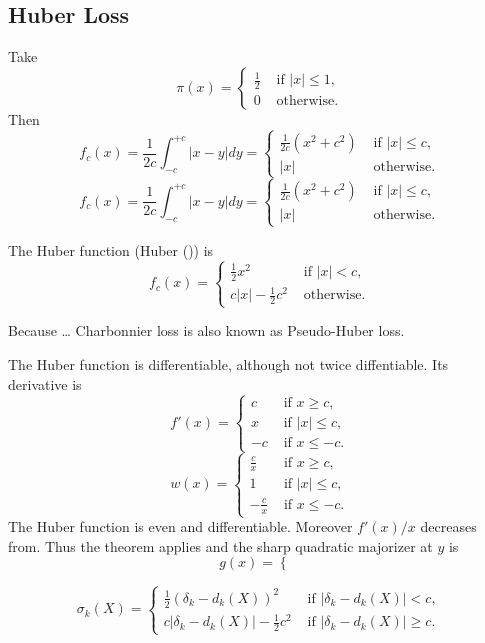 \documentclass[
  12pt,
  letterpaper,
  DIV=11,
  numbers=noendperiod]{scrartcl}
\begin{document}
\subsection{Huber Loss}\label{huber-loss}

Take \[
\pi(x)=\begin{cases}\frac12 &\text{ if }|x|\leq 1,\\0&\text{ otherwise.}\end{cases}
\] Then \[
f_c(x)=\frac{1}{2c}\int_{-c}^{+c}|x-y|dy=\begin{cases}
\frac{1}{2c}(x^2+c^2)&\text{ if }|x|\leq c,\\
|x|&\text{ otherwise}.
\end{cases}
\] \[
f_c(x)=\frac{1}{2c}\int_{-c}^{+c}|x-y|dy=\begin{cases}
\frac{1}{2c}(x^2+c^2)&\text{ if }|x|\leq c,\\
|x|&\text{ otherwise}.
\end{cases}
\]

The Huber function (Huber ()) is \[
f_c(x)=\begin{cases}
\frac12x^2&\text{ if }|x|<c,\\
c|x|-\frac12 c^2&\text{ otherwise}.
\end{cases}
\]

Because \ldots{} Charbonnier loss is also known as Pseudo-Huber loss.

The Huber function is differentiable, although not twice diffentiable.
Its derivative is \[
f'(x)=\begin{cases}
c&\text{ if }x\geq c,\\
x&\text{ if }|x|\leq c,\\
-c&\text{ if }x\leq -c.
\end{cases}
\] \[
w(x)=
\begin{cases}
\frac{c}{x}&\text{ if }x\geq c,\\
1&\text{ if }|x|\leq c,\\
-\frac{c}{x}&\text{ if }x\leq -c.
\end{cases}
\] The Huber function is even and differentiable. Moreover \(f'(x)/x\)
decreases from. Thus the theorem applies and the sharp quadratic
majorizer at \(y\) is \[
g(x)=\begin{cases}
\end{cases}
\]

\[
\sigma_k(X)=\begin{cases}
\frac12(\delta_k-d_k(X))^2&\text{ if }|\delta_k-d_k(X)|<c,\\
c|\delta_k-d_k(X)|-\frac12 c^2&\text{ if }|\delta_k-d_k(X)|\geq c.
\end{cases}
\]
\end{document}
